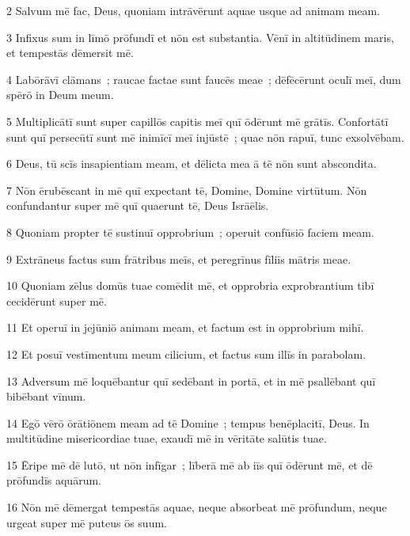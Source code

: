 
\psalmVerse
  {\phantom{00}2}
  {Salvum mē fac, Deus, quoniam intrāvērunt aquae usque ad animam meam.}


\psalmVerse
  {\phantom{00}3}
  {Infixus sum in līmō prōfundī et nōn est substantia. Vēnī in altitūdinem maris, et tempestās dēmersit mē.}


\psalmVerse
  {\phantom{00}4}
  {Labōrāvī clāmans~; raucae factae sunt faucēs meae~; dēfēcērunt oculī meī, dum spērō in Deum meum.}


\psalmVerse
  {\phantom{00}5}
  {Multiplicātī sunt super capillōs capitis meī quī ōdērunt mē grātīs. Confortātī sunt quī persecūtī sunt mē inimīcī meī injūstē~; quae nōn rapuī, tunc exsolvēbam.}


\psalmVerse
  {\phantom{00}6}
  {Deus, tū scīs insapientiam meam, et dēlicta mea ā tē nōn sunt abscondita.}


\psalmVerse
  {\phantom{00}7}
  {Nōn ērubēscant in mē quī expectant tē, Domine, Domine virtūtum. Nōn confundantur super mē quī quaerunt tē, Deus Isrāēlis.}


\psalmVerse
  {\phantom{00}8}
  {Quoniam propter tē sustinuī opprobrium~; operuit confūsiō faciem meam.}


\psalmVerse
  {\phantom{00}9}
  {Extrāneus factus sum frātribus meīs, et peregrīnus fīliīs mātris meae.}


\psalmVerse
  {\phantom{0}10}
  {Quoniam zēlus domūs tuae comēdit mē, et opprobria exprobrantium tibī cecidērunt super mē.}


\psalmVerse
  {\phantom{0}11}
  {Et operuī in jejūniō animam meam, et factum est in opprobrium mihī.}


\psalmVerse
  {\phantom{0}12}
  {Et posuī vestīmentum meum cilicium, et factus sum illīs in parabolam.}


\psalmVerse
  {\phantom{0}13}
  {Adversum mē loquēbantur quī sedēbant in portā, et in mē psallēbant quī bibēbant vīnum.}


\psalmVerse
  {\phantom{0}14}
  {Egō vērō ōrātiōnem meam ad tē Domine~; tempus benēplacitī, Deus. In multitūdine misericordiae tuae, exaudī mē in vēritāte salūtis tuae.}


\psalmVerse
  {\phantom{0}15}
  {Ēripe mē dē lutō, ut nōn infīgar~; līberā mē ab iīs quī ōdērunt mē, et dē prōfundīs aquārum.}


\psalmVerse
  {\phantom{0}16}
  {Nōn mē dēmergat tempestās aquae, neque absorbeat mē prōfundum, neque urgeat super mē puteus ōs suum.}


